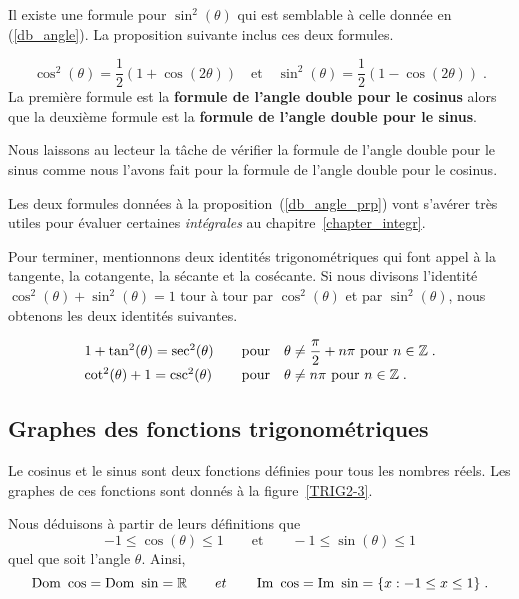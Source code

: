 {Il existe une formule pour $\sin^2(\theta)$ qui est
semblable à celle donnée en (\ref{db_angle}).  La proposition suivante
inclus ces deux formules. 

\begin{focus}{\prp}
\[
\cos^2(\theta) = \frac{1}{2} \left( 1 + \cos(2\theta) \right)
\quad \text{et} \quad 
\sin^2(\theta) = \frac{1}{2} \left( 1 - \cos(2\theta) \right) \; .
\]
La première formule est la {\bfseries formule de l'angle double pour
le cosinus} alors que la deuxième formule est la {\bfseries formule de
l'angle double pour le sinus}. \label{db_angle_prp}
\end{focus}

Nous laissons au lecteur la tâche de vérifier la formule de l'angle
double pour le sinus comme nous l'avons fait pour la formule de l'angle
double pour le cosinus.

\begin{rmk}
Les deux formules données à la proposition~(\ref{db_angle_prp}) vont
s'avérer très utiles pour évaluer certaines {\em intégrales} au
chapitre~\ref{chapter_integr}.
\end{rmk}

Pour terminer, mentionnons deux identités trigonométriques qui
font appel à la tangente, la cotangente, la sécante et la cosécante.
Si nous divisons l'identité $\cos^2(\theta) + \sin^2(\theta) = 1$ tour
à tour par $\cos^2(\theta)$ et par $\sin^2(\theta)$, nous obtenons les
deux identités suivantes.

\begin{focus}{\prp}
\[
\begin{array}{ll}
1 + \tan^2(\theta) = \sec^2(\theta) &\quad \text{pour} \quad \theta \neq
\displaystyle \frac{\pi}{2} + n \pi \ \text{pour} \ n \in \mathbb{Z} \; . \\[0.5em]
\cot^2(\theta) + 1 = \csc^2(\theta) &\quad \text{pour} \quad \theta \neq
n \pi \ \text{pour} \ n \in \mathbb{Z} \; .
\end{array}
\]
\end{focus}

\subsection{Graphes des fonctions trigonométriques}

Le cosinus et le sinus sont deux fonctions définies pour tous les
nombres réels.  Les graphes de ces fonctions sont donnés à la
figure~\ref{TRIG2-3}.

Nous déduisons à partir de leurs définitions que
\[
-1 \leq \cos(\theta) \leq 1 \qquad \text{et} \qquad
-1 \leq \sin(\theta) \leq 1
\]
quel que soit l'angle $\theta$.   Ainsi,
\[
\DO \cos = \DO \sin = \RR \qquad et \qquad
\IM \cos = \IM \sin = \{ x : -1 \leq x \leq 1 \} \; .
\]

}
